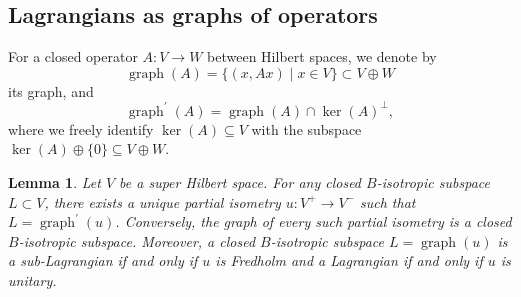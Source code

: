 \documentclass[10pt,a4paper]{amsart}
\numberwithin{equation}{section}
\newtheorem{Lemma}[Theorem]{Lemma}
\DeclareMathOperator{\graph}{\mathrm{graph}}
\begin{document}
\subsection{Lagrangians as graphs of operators}
\label{SectionLagrangianGraph}

For a closed operator $A \colon V \to W$ between Hilbert spaces, we denote by \[\graph(A) = \{(x, Ax) \mid x \in V\} \subset V \oplus W\] its graph, and
\begin{equation*}
\graph^\prime(A) = \graph(A) \cap \ker(A)^\perp,
\end{equation*}
where we freely identify $\ker(A) \subseteq V$ with the subspace $\ker(A) \oplus\{0\} \subseteq V \oplus W$.

\begin{Lemma} \label{LemmaLagrangianCorrespondence}
Let $V$ be a super Hilbert space.
For any closed $B$-isotropic subspace $L \subset V$, there exists a unique partial isometry $u\colon V^+ \to V^-$ such that $L = \graph^\prime(u)$.
Conversely, the graph of every such partial isometry is a closed $B$-isotropic subspace.
Moreover, a closed $B$-isotropic subspace $L = \graph(u)$ is a sub-Lagrangian if and only if $u$ is Fredholm and a Lagrangian if and only if $u$ is unitary.
\end{Lemma}
\end{document}

